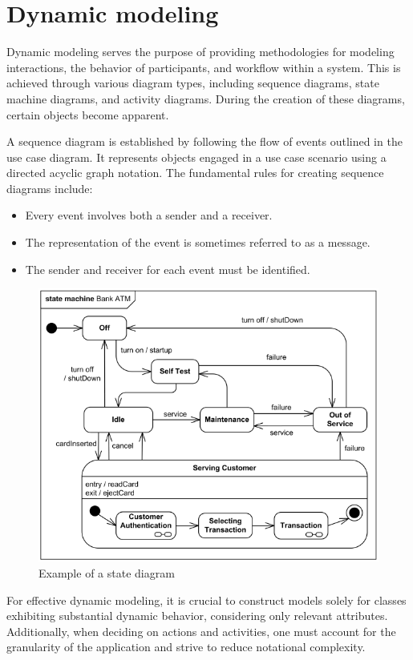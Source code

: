 \section{Dynamic modeling}

Dynamic modeling serves the purpose of providing methodologies for modeling interactions, the behavior of participants, and workflow within a system. 
This is achieved through various diagram types, including sequence diagrams, state machine diagrams, and activity diagrams. 
During the creation of these diagrams, certain objects become apparent.
 
A sequence diagram is established by following the flow of events outlined in the use case diagram. 
It represents objects engaged in a use case scenario using a directed acyclic graph notation. 
The fundamental rules for creating sequence diagrams include:
\begin{itemize}
    \item Every event involves both a sender and a receiver.
    \item The representation of the event is sometimes referred to as a message.
    \item The sender and receiver for each event must be identified.
\end{itemize}
\begin{figure}[H]
    \centering
    \includegraphics[width=0.5\linewidth]{images/state.png}
    \caption{Example of a state diagram}
\end{figure}
For effective dynamic modeling, it is crucial to construct models solely for classes exhibiting substantial dynamic behavior, considering only relevant attributes. 
Additionally, when deciding on actions and activities, one must account for the granularity of the application and strive to reduce notational complexity.